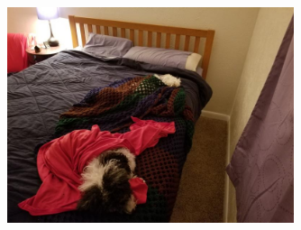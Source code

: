 \documentclass[aspectratio=1610,pdftex,dvipsnames,compress,xcolor={dvipsnames}]{beamer}
\newcommand{\acs}{\acrshort} %
\begin{document}


\begin{frame}[plain]{}
    \begin{figure}
        \centering
        \includegraphics[width=0.75\textwidth]{final.jpg}
    \end{figure}
\end{frame}


%
%
%



%    
%    
\end{document}
